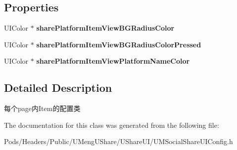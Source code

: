 \subsection*{Properties}
\begin{DoxyCompactItemize}
\item 
\mbox{\label{interface_u_m_social_platform_item_view_config_abd746aec16b79476d6595b9a4536c52b}} 
U\+I\+Color $\ast$ {\bfseries share\+Platform\+Item\+View\+B\+G\+Radius\+Color}
\item 
\mbox{\label{interface_u_m_social_platform_item_view_config_a65515707c4d3752bd398159df95ccd83}} 
U\+I\+Color $\ast$ {\bfseries share\+Platform\+Item\+View\+B\+G\+Radius\+Color\+Pressed}
\item 
\mbox{\label{interface_u_m_social_platform_item_view_config_a714031e7b79f98bd5316df9c383f439c}} 
U\+I\+Color $\ast$ {\bfseries share\+Platform\+Item\+View\+Platform\+Name\+Color}
\end{DoxyCompactItemize}


\subsection{Detailed Description}
每个page内\+Item的配置类 

The documentation for this class was generated from the following file\+:\begin{DoxyCompactItemize}
\item 
Pods/\+Headers/\+Public/\+U\+Meng\+U\+Share/\+U\+Share\+U\+I/U\+M\+Social\+Share\+U\+I\+Config.\+h\end{DoxyCompactItemize}
